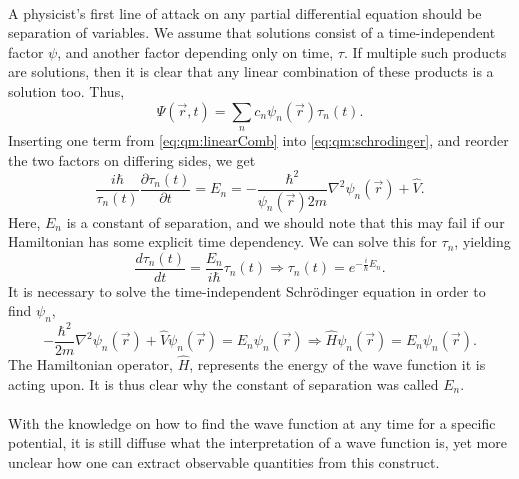\paragraph*{}
A physicist's first line of attack on any partial differential equation 
should be separation of variables.
We assume that solutions consist of a time-independent factor $\psi$, and
another factor depending only on time, $\tau$.
If multiple such products are solutions, then it is clear that any linear
combination of these products is a solution too.
Thus,
\begin{equation}
\label{eq:qm:linearComb}
\Psi(\vec{r},t) = \sum_n c_n \psi_n(\vec{r}) \tau_n(t).
\end{equation}
Inserting one term from \eqref{eq:qm:linearComb} into \eqref{eq:qm:schrodinger}, and reorder the two factors on
differing sides, we get
\begin{equation}
\frac{i\hbar}{\tau_n(t)} \frac{\partial \tau_n(t)}{\partial t} =
E_n =
- \frac{\hbar^2}{\psi_n(\vec{r}) 2m} \nabla^2 \psi_n(\vec{r}) + \hat{V} .
\end{equation}
Here, $E_n$ is a constant of separation, and we should note that this may fail
if our Hamiltonian has some explicit time dependency.
We can solve this for $\tau_n$, yielding
\begin{equation}
\frac{d\tau_n(t)}{dt} = \frac{E_n}{i\hbar} \tau_n(t)
\Rightarrow
\tau_n(t) = e^{-\frac{i}{\hbar}E_n} .
\end{equation}
It is necessary to solve the time-independent Schrödinger
equation in order to find $\psi_n$,
\begin{equation}
\label{eq:qm:schrodingernotime}
- \frac{\hbar^2}{2m} \nabla^2 \psi_n(\vec{r}) + \hat{V} \psi_n(\vec{r}) = E_n
\psi_n(\vec{r})
\Rightarrow
\hat{H} \psi_n(\vec{r}) = E_n \psi_n(\vec{r}) .
\end{equation}
The Hamiltonian operator, $\hat{H}$, represents the energy of the wave function it is acting upon.
It is thus clear why the constant of separation was called $E_n$.


\paragraph*{}
With the knowledge on how to find the wave function at any time for a
specific potential, it is still diffuse what the interpretation of a wave
function is, yet more unclear how one can extract observable quantities from
this construct.

